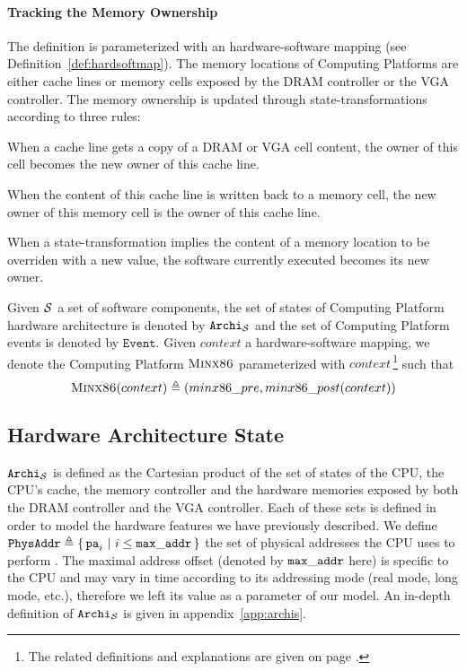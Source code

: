 \paragraph{Tracking the Memory Ownership} The  definition is
parameterized with an hardware-software mapping (see
Definition~\ref{def:hardsoftmap}). The memory locations of 
Computing Platforms are either cache lines or memory cells exposed by the DRAM
controller or the VGA controller. The memory ownership is updated through
state-transformations according to three rules:
\begin{compactenum}
  \item When a cache line gets a copy of a DRAM or VGA cell content, the owner
    of this cell becomes the new owner of this cache line.
  \item When the content of this cache line is written back to a memory cell,
    the new owner of this memory cell is the owner of this cache line.
  \item When a state-transformation implies the content of a memory location to
    be overriden with a new value, the software currently executed becomes its
    new owner.
\end{compactenum}

Given $\mathcal{S}$ a set of software components, the set of states of
 Computing Platform hardware architecture is denoted by
$\texttt{Archi}_{\mathcal{S}}$ and the set of  Computing Platform
events is denoted by $\texttt{Event}$. Given $context$ a hardware-software
mapping, we denote the Computing Platform $\textsc{Minx86}$ parameterized
with $context$\,\footnote{The related definitions and explanations are given on
page \pageref{page:minx86def}.} such that \[ \textsc{Minx86}(context)
\triangleq (minx86\_pre, minx86\_post(context)) \]

\subsection{Hardware Architecture State}

$\texttt{Archi}_{\mathcal{S}}$ is defined as the Cartesian product of the set of
states of the CPU, the CPU's cache, the memory controller and the hardware
memories exposed by both the DRAM controller and the VGA controller. Each of
these sets is defined in order to model the hardware features we have previously
described. We define $\texttt{PhysAddr} \triangleq \{\,\mathtt{pa}_i\ |\ i \leq
\mathtt{max\_addr}\,\}$ the set of physical addresses the CPU uses to perform \IO. The
maximal address offset (denoted by $\mathtt{max\_addr}$ here) is specific to the
CPU and may vary in time according to its addressing mode (real mode, long mode,
etc.), therefore we left its value as a parameter of our model.  An in-depth
definition of $\texttt{Archi}_{\mathcal{S}}$ is given in appendix~\ref{app:archis}.

